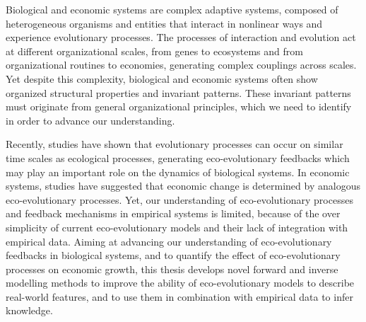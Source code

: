 %
\label{sec:summary}

Biological and economic systems are complex adaptive systems, composed of heterogeneous organisms and entities that interact in nonlinear ways and experience evolutionary processes.
% 
The processes of interaction and evolution act at different organizational scales, from genes to ecosystems and from organizational routines to economies, generating complex couplings across scales. Yet despite this complexity, biological and economic systems often show organized structural properties and invariant patterns. 
% 
%
These invariant patterns must originate from general organizational principles, which we need to identify in order to advance our understanding.

Recently, studies have shown that evolutionary processes can occur on similar time scales as ecological processes, generating eco-evolutionary feedbacks which may play an important role on the dynamics of biological systems. %
% 
In economic systems, studies have suggested that economic change is determined by analogous eco-evolutionary processes. 
Yet, our understanding of eco-evolutionary processes and feedback mechanisms in empirical systems is limited, because of the over simplicity of current eco-evolutionary models and their lack of integration with empirical data. %
% 
% 
% 
Aiming at advancing our understanding of eco-evolutionary feedbacks in biological systems, and to quantify the effect of eco-evolutionary processes on economic growth, this thesis develops novel forward and inverse modelling methods to improve the ability of eco-evolutionary models to describe real-world features, and to use them in combination with empirical data to infer knowledge.


